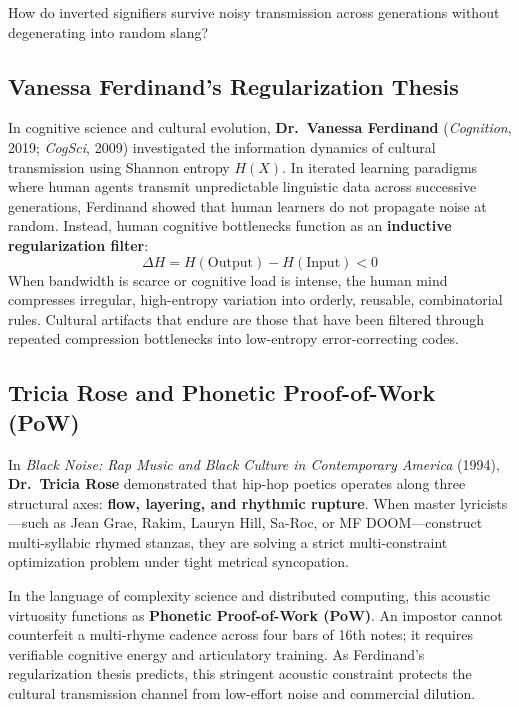 \documentclass[11pt,letterpaper]{article}
\begin{document}
How do inverted signifiers survive noisy transmission across generations without degenerating into random slang?

\subsection{Vanessa Ferdinand's Regularization Thesis}
In cognitive science and cultural evolution, \textbf{Dr.~Vanessa Ferdinand} (\textit{Cognition}, 2019; \textit{CogSci}, 2009) investigated the information dynamics of cultural transmission using Shannon entropy $H(X)$. In iterated learning paradigms where human agents transmit unpredictable linguistic data across successive generations, Ferdinand showed that human learners do not propagate noise at random. Instead, human cognitive bottlenecks function as an \textbf{inductive regularization filter}:
\begin{equation}
    \Delta H = H(\text{Output}) - H(\text{Input}) < 0
\end{equation}
When bandwidth is scarce or cognitive load is intense, the human mind compresses irregular, high-entropy variation into orderly, reusable, combinatorial rules. Cultural artifacts that endure are those that have been filtered through repeated compression bottlenecks into low-entropy error-correcting codes.

\subsection{Tricia Rose and Phonetic Proof-of-Work (PoW)}
In \textit{Black Noise: Rap Music and Black Culture in Contemporary America} (1994), \textbf{Dr.~Tricia Rose} demonstrated that hip-hop poetics operates along three structural axes: \textbf{flow, layering, and rhythmic rupture}. When master lyricists---such as Jean Grae, Rakim, Lauryn Hill, Sa-Roc, or MF DOOM---construct multi-syllabic rhymed stanzas, they are solving a strict multi-constraint optimization problem under tight metrical syncopation.

In the language of complexity science and distributed computing, this acoustic virtuosity functions as \textbf{Phonetic Proof-of-Work (PoW)}. An impostor cannot counterfeit a multi-rhyme cadence across four bars of 16th notes; it requires verifiable cognitive energy and articulatory training. As Ferdinand's regularization thesis predicts, this stringent acoustic constraint protects the cultural transmission channel from low-effort noise and commercial dilution.
\end{document}
